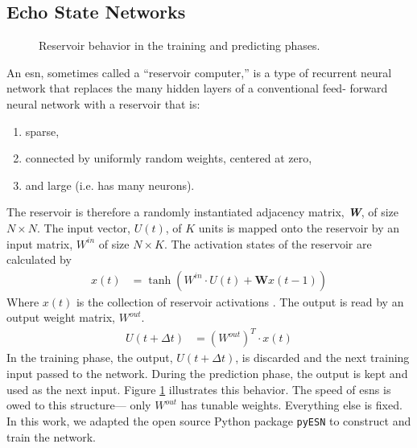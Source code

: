 \subsection{Echo State Networks}

\begin{figure}[htp]
  \centering


  \caption{Reservoir behavior in the training and predicting phases.}
  \label{fig:reservoir_graph}
\end{figure}

An \gls{esn}, sometimes called a ``reservoir computer,''\cite{pathak_using_2017, pathak_model-free_2018, vlachas_backpropagation_2020} is a type of recurrent
neural network that replaces the many hidden layers of a conventional feed-
forward neural network with a reservoir that is:
\begin{enumerate}
  \item sparse,
  \item connected by uniformly random weights, centered at zero,
  \item and large (i.e. has many neurons).
\end{enumerate}

The reservoir is therefore a randomly instantiated adjacency matrix,
\textit{\textbf{W}}, of size $N \times N$. The input vector, $U(t)$, of
$K$ units is mapped onto the reservoir by an input matrix,
 $W^{in}$ of size $N \times K$. The activation states of the reservoir are calculated by
 \begin{align}
   x(t) &= \tanh \left(W^{in}\cdot U(t) + \mathbf{W}x(t-1)\right)
 \end{align}
 Where $x(t)$ is the collection of reservoir activations \cite{shi_energy_2016, pathak_model-free_2018, lukosevicius_practical_2012}.
 The output is read by an output weight matrix,
 $W^{out}$.
 \begin{align}
   U(t+\Delta t) &= \left(W^{out}\right)^T\cdot x(t)
 \end{align}
 In the training phase, the output, $U(t+\Delta t)$, is
 discarded and the next training input passed to the network. During the
 prediction phase, the output is kept and used as the next input. Figure \ref{fig:reservoir_graph} illustrates this behavior. The speed of \glspl{esn} is owed
 to this structure--- only $W^{out}$ has tunable weights. Everything else is
 fixed. In this work, we adapted the open source Python package \texttt{pyESN} \cite{korndorfer_pyesn_2015} to construct and train the network.

